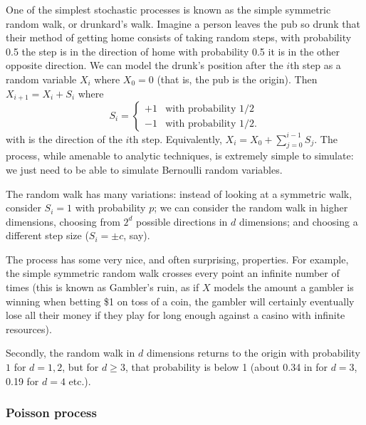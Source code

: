 \documentclass[11pt]{article}
\newcommand{\var}{\mbox{Var}}
\begin{document}
One of the simplest stochastic processes is known as the simple symmetric random walk, or drunkard's walk.  Imagine a person leaves the pub so drunk that their method of getting home consists of taking random steps, with probability 0.5 the step is in the direction of home with probability 0.5 it is in the other opposite direction.   We can model the drunk's position after the $i$th step as a random variable $X_i$ where $X_0 = 0$ (that is, the pub is the origin).   Then $X_{i+1} = X_i + S_{i}$ where 
\[S_{i} =   
\begin{cases}
   +1  & \mbox{with probability } 1/2 \\
   -1    &  \mbox{with probability }  1/2.
  \end{cases}
 \] with is the direction of the $i$th step.  Equivalently, $X_i = X_0 + \sum_{j = 0}^{i-1} S_j.$  
The process, while amenable to analytic techniques, is extremely simple to simulate: we just need to be able to simulate Bernoulli random variables.  



The random walk has many variations: instead of looking at a symmetric walk, consider $S_i = 1$ with probability $p$; we can consider the random walk in higher dimensions, choosing from $2^d$ possible directions in $d$ dimensions; and choosing a different step size ($S_i = \pm c$, say).

The process has some very nice, and often surprising, properties.  For example, the simple symmetric random walk crosses every point an infinite number of times (this is known as Gambler's ruin, as if $X$ models the amount a gambler is winning when betting \$1 on toss of a coin, the gambler will certainly eventually lose all their money if they play for long enough against a casino with infinite resources).  

Secondly, the random walk in $d$ dimensions returns to the origin with probability $1$ for $d = 1,2$, but for $d\geq 3$, that probability is below 1 (about 0.34 in for $d = 3$, 0.19 for $d = 4$ etc.).



\subsubsection{Poisson process}
\end{document}
